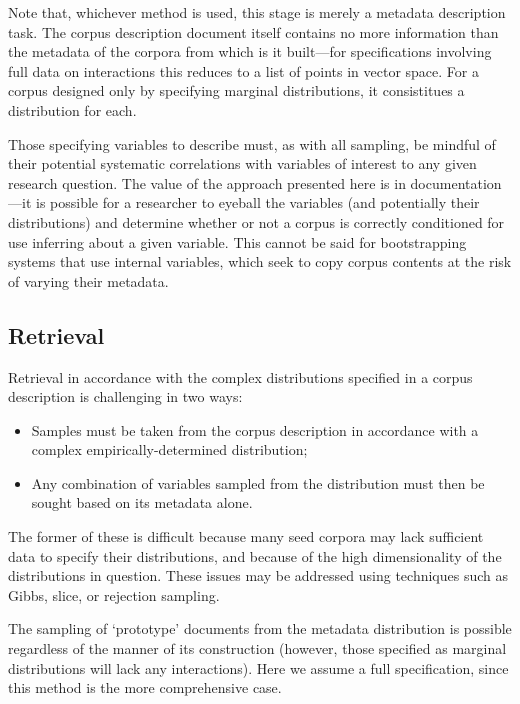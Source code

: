 Note that, whichever method is used, this stage is merely a metadata description task.  The corpus description document itself contains no more information than the metadata of the corpora from which is it built---for specifications involving full data on interactions this reduces to a list of points in vector space.  For a corpus designed only by specifying marginal distributions, it consistitues a distribution for each.

Those specifying variables to describe must, as with all sampling, be mindful of their potential systematic correlations with variables of interest to any given research question.  The value of the approach presented here is in documentation---it is possible for a researcher to eyeball the variables (and potentially their distributions) and determine whether or not a corpus is correctly conditioned for use inferring about a given variable.  This cannot be said for bootstrapping systems that use internal variables, which seek to copy corpus contents at the risk of varying their metadata.


\subsection{Retrieval}
Retrieval in accordance with the complex distributions specified in a corpus description is challenging in two ways:

\begin{itemize}
    \item Samples must be taken from the corpus description in accordance with a complex empirically-determined distribution;
    \item Any combination of variables sampled from the distribution must then be sought based on its metadata alone.
\end{itemize}

The former of these is difficult because many seed corpora may lack sufficient data to specify their distributions, and because of the high dimensionality of the distributions in question.  These issues may be addressed using techniques such as Gibbs, slice, or rejection sampling.

The sampling of `prototype' documents from the metadata distribution is possible regardless of the manner of its construction (however, those specified as marginal distributions will lack any interactions).  Here we assume a full specification, since this method is the more comprehensive case.

